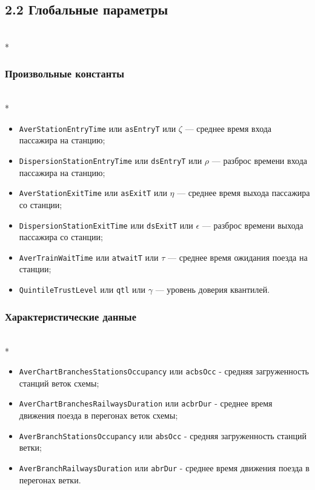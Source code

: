 \documentclass[12pt]{article}
\begin{document}
\subsection*{2.2 Глобальные параметры}\mbox{}\\*

\subsubsection*{Произвольные константы}\mbox{}\\*

\begin{itemize}  
  \item \texttt{AverStationEntryTime} или \texttt{asEntryT} или $\zeta$ — среднее время входа пассажира на станцию;
  \item \texttt{DispersionStationEntryTime} или \texttt{dsEntryT} или $\rho$ — разброс времени входа пассажира на станцию;
  \item \texttt{AverStationExitTime} или \texttt{asExitT} или $\eta$ — среднее время выхода пассажира со станции;
  \item \texttt{DispersionStationExitTime} или \texttt{dsExitT} или $\epsilon$ — разброс времени выхода пассажира со станции;
  \item \texttt{AverTrainWaitTime} или \texttt{atwaitT} или $\tau$ — среднее время ожидания поезда на станции;
  \item \texttt{QuintileTrustLevel} или \texttt{qtl} или $\gamma$ — уровень доверия квантилей.
\end{itemize} 

\subsubsection*{Характеристические данные}\mbox{}\\*

\begin{itemize}
  \item \texttt{AverChartBranchesStationsOccupancy} или \texttt{acbsOcc} - средняя загруженность станций веток схемы;
  \item \texttt{AverChartBranchesRailwaysDuration} или \texttt{acbrDur} - среднее время движения поезда в перегонах веток схемы;
  \item \texttt{AverBranchStationsOccupancy} или \texttt{absOcc} - средняя загруженность станций ветки;
  \item \texttt{AverBranchRailwaysDuration} или \texttt{abrDur} - среднее время движения поезда в перегонах ветки.
\end{itemize}
\end{document}
